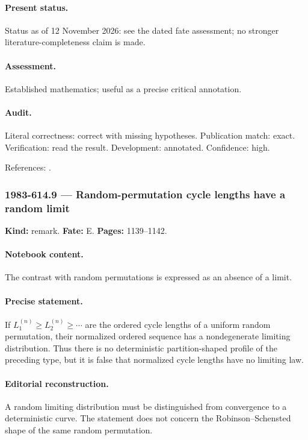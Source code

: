 \paragraph{Present status.} Status as of 12 November 2026: see the dated fate assessment; no stronger literature-completeness claim is made.

\paragraph{Assessment.} Established mathematics; useful as a precise critical annotation.

\paragraph{Audit.} Literal correctness: correct with missing hypotheses. Publication match: exact. Verification: read the result. Development: annotated. Confidence: high.

\noindent References: \citep{vershikkerov1985dimensions}.\par

\subsubsection{1983-614.9 --- Random-permutation cycle lengths have a random limit}

\label{item:1983-614.9}

\noindent\textbf{Kind:} remark. \textbf{Fate:} E. \textbf{Pages:} 1139--1142.\par

\paragraph{Notebook content.} The contrast with random permutations is expressed as an absence of a limit.

\paragraph{Precise statement.} If $L_1^{(n)}\ge L_2^{(n)}\ge\cdots$ are the ordered cycle lengths of a uniform random permutation, their normalized ordered sequence has a nondegenerate limiting distribution. Thus there is no deterministic partition-shaped profile of the preceding type, but it is false that normalized cycle lengths have no limiting law.

\paragraph{Editorial reconstruction.} A random limiting distribution must be distinguished from convergence to a deterministic curve. The statement does not concern the Robinson--Schensted shape of the same random permutation.

